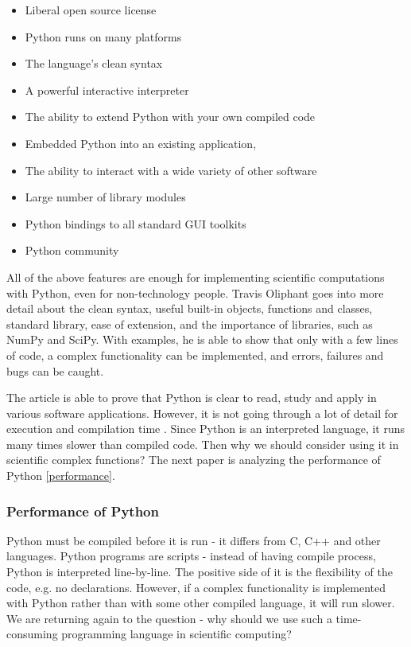 \begin{itemize}
\item Liberal open source license
\item Python runs on many platforms
\item The language’s clean syntax
\item A powerful interactive interpreter
\item The ability to extend Python with your own compiled code
\item Embedded Python into an existing application,
\item The ability to interact with a wide variety of other software
\item Large number of library modules
\item Python bindings to all standard GUI toolkits
\item Python community
\end{itemize}

All of the above features are enough for implementing scientific computations with Python, even for non-technology people. Travis Oliphant goes into more detail about the clean syntax, useful built-in objects, functions and classes, standard library, ease of extension, and the importance of libraries, such as NumPy and SciPy. With examples, he is able to show that only with a few lines of code, a complex functionality can be implemented, and errors, failures and bugs can be caught. 

The article is able to prove that Python is clear to read, study and apply in various software applications. However, it is not going through a lot of detail for execution and compilation time \cite{HansPython}. Since Python is an interpreted language, it runs many times slower than compiled code. Then why we should consider using it in scientific complex functions? The next paper is analyzing the performance of Python \ref{performance}.

\subsubsection*{Performance of Python}
\label{performance}

Python must be compiled before it is run - it differs from C, C++ and other languages. Python programs are scripts - instead of having compile process, Python is interpreted line-by-line. The positive side of it is the flexibility of the code, e.g. no declarations. However, if a complex functionality is implemented with Python rather than with some other compiled language, it will run slower. We are returning again to the question - why should we use such a time-consuming programming language in scientific computing? \cite{ScottPython}

